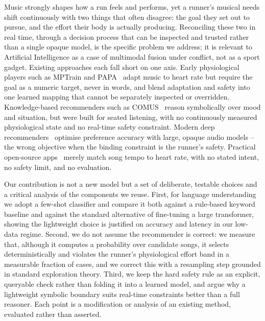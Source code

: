 \documentclass[11pt,a4paper]{article}
\begin{document}
	Music strongly shapes how a run feels and performs, yet a runner's musical needs shift continuously with two things that often disagree: the goal they set out to pursue, and the effort their body is actually producing. Reconciling these two in real time, through a decision process that can be inspected and trusted rather than a single opaque model, is the specific problem we address; it is relevant to Artificial Intelligence as a case of multimodal fusion under conflict, not as a sport gadget. Existing approaches each fall short on one axis. Early physiological players such as MPTrain and PAPA~\cite{oliver2006mptrain, oliver2006papa} adapt music to heart rate but require the goal as a numeric target, never in words, and blend adaptation and safety into one learned mapping that cannot be separately inspected or overridden. Knowledge-based recommenders such as COMUS~\cite{song2009comus} reason symbolically over mood and situation, but were built for seated listening, with no continuously measured physiological state and no real-time safety constraint. Modern deep recommenders~\cite{oord2013deep} optimise preference accuracy with large, opaque audio models -- the wrong objective when the binding constraint is the runner's safety. Practical open-source apps~\cite{wu2020heartbpmusic, ray2018heartbeat} merely match song tempo to heart rate, with no stated intent, no safety limit, and no evaluation.

	Our contribution is not a new model but a set of deliberate, testable choices and a critical analysis of the components we reuse. First, for language understanding we adopt a few-shot classifier and compare it both against a rule-based keyword baseline and against the standard alternative of fine-tuning a large transformer, showing the lightweight choice is justified on accuracy and latency in our low-data regime. Second, we do not assume the recommender is correct: we measure that, although it computes a probability over candidate songs, it selects deterministically and violates the runner's physiological effort band in a measurable fraction of cases, and we correct this with a resampling step grounded in standard exploration theory. Third, we keep the hard safety rule as an explicit, queryable check rather than folding it into a learned model, and argue why a lightweight symbolic boundary suits real-time constraints better than a full reasoner. Each point is a modification or analysis of an existing method, evaluated rather than asserted.

\end{document}
